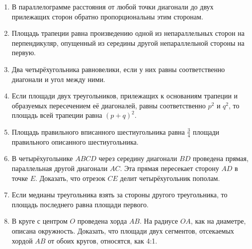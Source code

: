 \documentclass[twoside]{book}
\begin{document}
\begin{enumerate}
 \item
В параллелограмме расстояния от любой точки диагонали до двух прилежащих сторон обратно пропорциональны этим сторонам.

 \item
Площадь трапеции равна произведению одной из непараллельных сторон на перпендикуляр, опущенный из середины другой непараллельной стороны на первую.

 \item
Два четырёхугольника равновелики, если у них равны соответственно диагонали и угол между ними.

 \item
Если площади двух треугольников, прилежащих к основаниям трапеции и образуемых пересечением её диагоналей, равны соответственно $p^2$ и $q^2$, то площадь всей трапеции равна $(p+q)^2$.

 \item
Площадь правильного вписанного шестиугольника равна $\tfrac34$ площади правильного описанного шестиугольника.

 \item
В четырёхугольнике $ABCD$ через середину диагонали $BD$ проведена прямая, параллельная другой диагонали $AC$.
Эта прямая пересекает сторону $AD$ в точке $E$.
Доказать, что отрезок $CE$ делит четырёхугольник пополам.

 \item
Если медианы треугольника взять за стороны другого треугольника, то площадь последнего равна площади первого.

 \item
В круге с центром $O$ проведена хорда $AB$.
На радиусе $OA$, как на диаметре, описана окружность.
Доказать, что площади двух сегментов, отсекаемых хордой $AB$ от обоих кругов, относятся, как 4:1.


\end{enumerate}

\begin{center}
\end{center}
\end{document}
